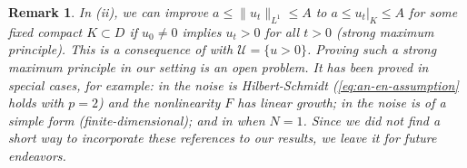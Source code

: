 \documentclass[final]{amsart}
\newtheorem{rem}[thm]{Remark}
\numberwithin{thm}{section}
\numberwithin{equation}{section}
\newcommand{\U}{\mathcal{U}}
\begin{document}
\begin{rem}\label{rem:strong-maximum-principle}
    In (ii),  we can improve $a \leq \|u_t\|_{L^1}\leq A$ to $a \leq u_t|_K \leq A$ for some fixed compact $K \subset D$ if $u_0 \neq 0$ implies $u_t > 0$ for all $t > 0$ (strong maximum principle). This is a consequence of  with $\U = \{u > 0\}$. Proving such a strong maximum principle in our setting is an open problem. It has been proved in special cases, for example: in \cite[Theorem 1.2]{SPDE-harnack} the noise is Hilbert-Schmidt (\eqref{eq:an-en-assumption} holds with $p = 2$) and the nonlinearity $F$ has linear growth; in \cite[Theorem 2.1]{stochastic-SIR-analytical}  the noise is of a simple form (finite-dimensional); and in \cite[Theorem 2.3]{space-time} when $N=1$. 
    Since we did not find a short way to incorporate 
    these references to our results, we leave it for future endeavors. 
\end{rem}
\end{document}
